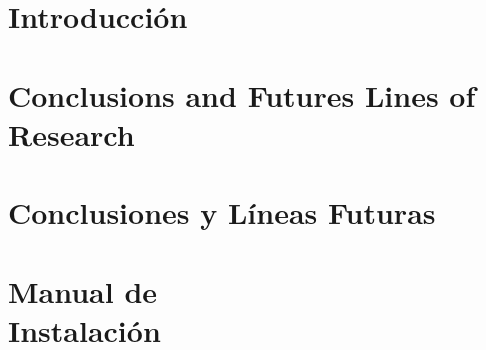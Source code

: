\documentclass[12pt, a4paper, twoside]{article}
\begin{document}


\clearpage
\setcounter{page}{1}



\newpage



\newpage



\tableofcontents

\section{Introducción}


\section{Conclusions and Futures Lines of Research}


\section{Conclusiones y Líneas Futuras}


\printbibliography

\newpage

\appendix
\section{Manual de \\ Instalación}


\end{document}
